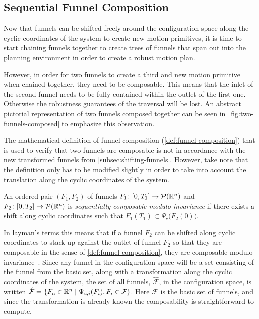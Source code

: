 \subsection{Sequential Funnel Composition}
\label{sec:composable-funnels}

Now that funnels can be shifted freely around the configuration space along the
cyclic coordinates of the system to create new motion primitives, it is time to
start chaining funnels together to create trees of funnels that span out into
the planning environment in order to create a robust motion plan.

However, in order for two funnels to create a third and new motion primitive
when chained together, they need to be composable. This means that the inlet of
the second funnel needs to be fully contained within the outlet of the first
one. Otherwise the robustness guarantees of the traversal will be lost. An
abstract pictorial representation of two funnels composed together can be seen
in~\cref{fig:two-funnels-composed} to emphasize this observation.

The mathematical definition of funnel composition
(\cref{def:funnel-composition}) that is used to verify that two funnels are
composable is not in accordance with the new transformed funnels from
\cref{subsec:shifting-funnels}. However, take note that the definition only has
to be modified slightly in order to take into account the translation along the
cyclic coordinates of the system.
\begin{definition}
  \label{def:invarant-funnel-composition}
  An ordered pair \((F_1,F_2)\) of funnels \(F_1 \colon [0,T_1] \rightarrow
  \mathcal{P}(\mathbb{R}^n)\) and \(F_2 \colon [0,T_2] \rightarrow \mathcal{P}(\mathbb{R}^n)\)
  is \textit{sequentially composable modulo invariance} if there exists a shift
  along cyclic coordinates such that \(F_{1}(T_1) \subset
  \Psi_{c}\bigl(F_2(0)\bigr) \).
\end{definition}
In layman's terms this means that if a funnel \(F_2\) can be shifted along
cyclic coordinates to stack up against the outlet of funnel \(F_2\) so that they
are composable in the sense of \cref{def:funnel-composition}, they are
composable modulo
invariance~\cite[definition~3,sec~5]{majumdarFunnelLibrariesRealtime2017}. Since
any funnel in the configuration space will be a set consisting of the funnel
from the basic set, along with a transformation along the cyclic coordinates of
the system, the set of all funnels, \(\hat{\mathcal{F}}\), in the configuration
space, is written \(\hat{\mathcal{F}} = \lbrace F_n \in \mathbb{R}^n \mid \Psi_{c,i}(F_i),
  F_i \in \mathcal{F}\rbrace\). Here \(\mathcal{F}\) is the basic set of funnels, and
since the transformation is already known the composability is straightforward
to compute.

